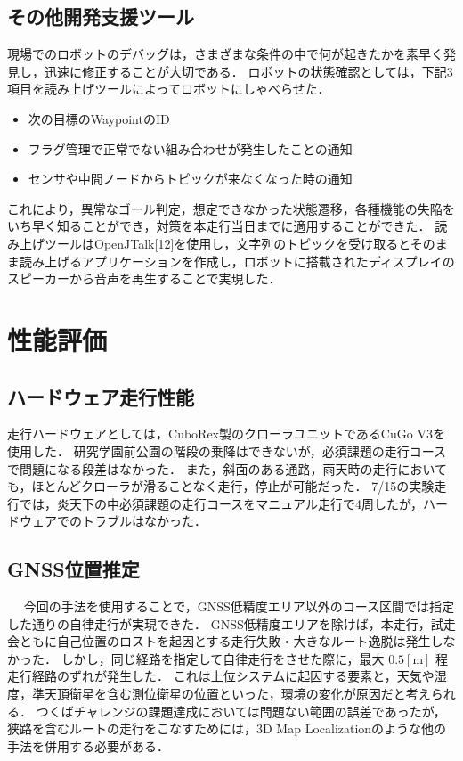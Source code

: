 \documentclass[platex,dvipdfmx]{rbproceedings}
\begin{document}
\subsection{その他開発支援ツール}
現場でのロボットのデバッグは，さまざまな条件の中で何が起きたかを素早く発見し，迅速に修正することが大切である．
ロボットの状態確認としては，下記3項目を読み上げツールによってロボットにしゃべらせた．
\begin{itemize}
    \item 次の目標のWaypointのID
    \item フラグ管理で正常でない組み合わせが発生したことの通知
    \item センサや中間ノードからトピックが来なくなった時の通知
\end{itemize}
これにより，異常なゴール判定，想定できなかった状態遷移，各種機能の失陥をいち早く知ることができ，対策を本走行当日までに適用することができた．
読み上げツールはOpenJTalk[12]を使用し，文字列のトピックを受け取るとそのまま読み上げるアプリケーションを作成し，ロボットに搭載されたディスプレイのスピーカーから音声を再生することで実現した．

\section{性能評価}
\subsection{ハードウェア走行性能}
走行ハードウェアとしては，CuboRex製のクローラユニットであるCuGo V3を使用した．
研究学園前公園の階段の乗降はできないが，必須課題の走行コースで問題になる段差はなかった．
また，斜面のある通路，雨天時の走行においても，ほとんどクローラが滑ることなく走行，停止が可能だった．
7/15の実験走行では，炎天下の中必須課題の走行コースをマニュアル走行で4周したが，ハードウェアでのトラブルはなかった．

\subsection{GNSS位置推定}　\label{ss:gnss_eval}
今回の手法を使用することで，GNSS低精度エリア以外のコース区間では指定した通りの自律走行が実現できた．
GNSS低精度エリアを除けば，本走行，試走会ともに自己位置のロストを起因とする走行失敗・大きなルート逸脱は発生しなかった．
しかし，同じ経路を指定して自律走行をさせた際に，最大 $0.5[\mathrm{m}]$ 程走行経路のずれが発生した．
これは上位システムに起因する要素と，天気や湿度，準天頂衛星を含む測位衛星の位置といった，環境の変化が原因だと考えられる．
つくばチャレンジの課題達成においては問題ない範囲の誤差であったが，狭路を含むルートの走行をこなすためには，3D Map Localizationのような他の手法を併用する必要がある．
\end{document}
